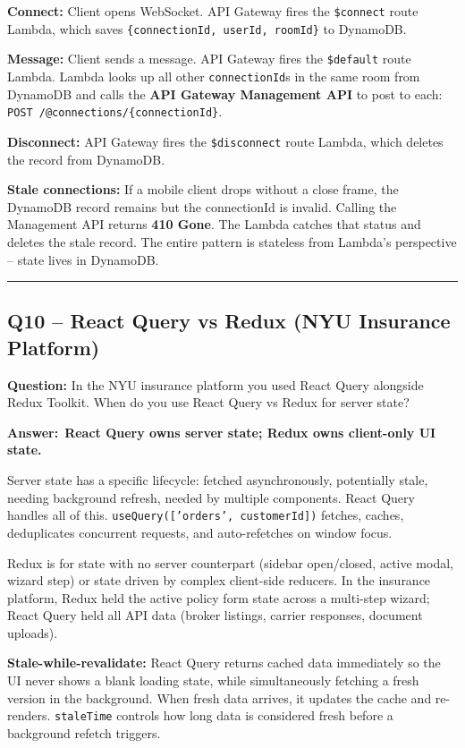 \documentclass[letterpaper,10pt]{article}
\newlength{\boxwidth}
\newcommand{\questionbox}[1]{%
  \vspace{6pt}%
  \noindent\colorbox{qbg}{%
    \begin{minipage}{\boxwidth}%
      \vspace{3pt}\textbf{\textcolor{nordblue}{Question:}} #1\vspace{3pt}%
    \end{minipage}%
  }\vspace{2pt}%
}
\newcommand{\answerlabel}{\noindent\textbf{\textcolor{answerblue}{Answer:}}~}
\begin{document}
\textbf{Connect:} Client opens WebSocket. API Gateway fires the \texttt{\$connect} route Lambda, which saves \texttt{\{connectionId, userId, roomId\}} to DynamoDB.

\textbf{Message:} Client sends a message. API Gateway fires the \texttt{\$default} route Lambda. Lambda looks up all other \texttt{connectionId}s in the same room from DynamoDB and calls the \textbf{API Gateway Management API} to post to each: \texttt{POST /@connections/\{connectionId\}}.

\textbf{Disconnect:} API Gateway fires the \texttt{\$disconnect} route Lambda, which deletes the record from DynamoDB.

\textbf{Stale connections:} If a mobile client drops without a close frame, the DynamoDB record remains but the connectionId is invalid. Calling the Management API returns \textbf{410 Gone}. The Lambda catches that status and deletes the stale record. The entire pattern is stateless from Lambda's perspective -- state lives in DynamoDB.

\medskip\rule{\linewidth}{0.2pt}

\subsection*{Q10 -- React Query vs Redux (NYU Insurance Platform)}

\questionbox{In the NYU insurance platform you used React Query alongside Redux Toolkit. When do you use React Query vs Redux for server state?}

\answerlabel \textbf{React Query owns server state; Redux owns client-only UI state.}

Server state has a specific lifecycle: fetched asynchronously, potentially stale, needing background refresh, needed by multiple components. React Query handles all of this. \texttt{useQuery(['orders', customerId])} fetches, caches, deduplicates concurrent requests, and auto-refetches on window focus.

Redux is for state with no server counterpart (sidebar open/closed, active modal, wizard step) or state driven by complex client-side reducers. In the insurance platform, Redux held the active policy form state across a multi-step wizard; React Query held all API data (broker listings, carrier responses, document uploads).

\textbf{Stale-while-revalidate:} React Query returns cached data immediately so the UI never shows a blank loading state, while simultaneously fetching a fresh version in the background. When fresh data arrives, it updates the cache and re-renders. \texttt{staleTime} controls how long data is considered fresh before a background refetch triggers.
\end{document}
